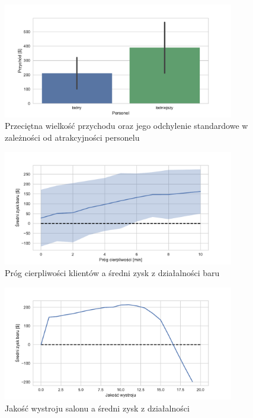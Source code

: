 \documentclass[12pt, a4paper, oneside]{mwart} %
\begin{document}
\begin{figure}
\centering
\caption{Przeciętna wielkość przychodu oraz jego odchylenie standardowe w zależności od atrakcyjności personelu}
\label{wyk_personel}
\includegraphics[width = 0.9\textwidth]{wykresy/personel.pdf}
\end{figure}

\begin{figure}
\centering
\caption{Próg cierpliwości klientów a średni zysk z działalności baru}
\label{wyk_kolejka}
\includegraphics[width = 0.9\textwidth]{wykresy/zajecie_w_kolejce.pdf}
\end{figure}

\begin{figure}
\centering
\caption{Jakość wystroju salonu a średni zysk z działalności}
\label{wyk_wystroj}
\includegraphics[width = 0.9\textwidth]{wykresy/wystroj.pdf}
\end{figure}
\end{document}
